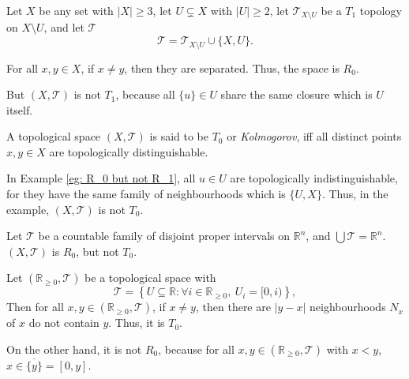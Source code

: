\begin{example}
	\label{eg: R_0 but not T_1}
	
	Let $X$ be any set with $|X| \ge 3$, let $U \subsetneq X$ with $|U| \ge 2$, let $\mathcal T_{X \setminus U}$ be a $T_1$ topology on $X \setminus U$, and let $\mathcal T$
	$$
	\mathcal T = \mathcal T_{X \setminus U} \cup \{X, U\}.
	$$
	
	For all $x,y \in X$, if $x \ne y$, then they are separated. Thus, the space is $R_0$.
	
	But $(X, \mathcal T)$ is not $T_1$, because all $\{u\} \in U$ share the same closure which is $U$ itself.
\end{example}




\begin{definition}
	[$T_0$ spaces]
	\label{def: T_1 spaces}
	A topological space $(X, \mathcal T)$ is said to be $T_0$ or \textit{Kolmogorov}, iff all distinct points $x,y \in X$ are topologically distinguishable.
\end{definition}


\begin{note}
	In Example \ref{eg: R_0 but not R_1}, all $u \in U$ are topologically indistinguishable, for they have the same family of neighbourhoods which is $\{U, X\}$. Thus, in the example, $(X, \mathcal T)$ is not $T_0$.
\end{note}


\begin{example}
	Let $\mathcal T$ be a countable family of disjoint proper intervals on $\mathbb R^n$, and $\bigcup \mathcal T = \mathbb R^n$. $(X, \mathcal T)$ is $R_0$, but not $T_0$.
\end{example}


\begin{example}
	\label{eg: T_0 but not T_1}
	Let $(\mathbb R_{\ge 0}, \mathcal T)$ be a topological space with
	$$
	\mathcal T = \left\{ U \subseteq \mathbb R : \forall i \in \mathbb R_{\ge 0}, \ U_i = [0, i)  \right\},
	$$
	Then for all $x,y \in (\mathbb R_{\ge 0}, \mathcal T)$, if $x \ne y$, then there are $|y - x|$ neighbourhoods $N_x$ of $x$ do not contain $y$. Thus, it is $T_0$.
	
	On the other hand, it is not $R_0$, because for all $x, y \in (\mathbb R_{\ge 0}, \mathcal T)$ with $x < y$, $x \in \overline{\{y\}} = [0, y]$.
\end{example}






